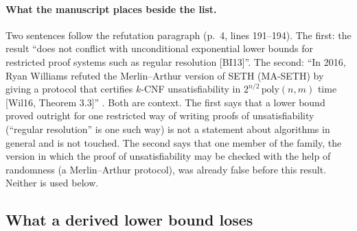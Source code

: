 \begin{table}[htbp]
\caption{The hypotheses the manuscript's \S1.1.1--\S1.1.2 list, each in
the form the manuscript states it (page of \texttt{paper.pdf}, lines of
the committed extract), with the manuscript's own source for that form,
the logical form in symbols, and the part of the verified theorem that
denies it (lines 194--217 of the comparator file at \texttt{4eaee875}).
$A$, $C_k$, $d_k$ are the never-computed constants of
Section~\ref{sec:statement}. Generated, with every page and fragment
checked against the extract and the clone, by
\texttt{python3 -I paper3/scripts/consequences.py}.}
\label{tab:hypotheses}
\scriptsize

\end{table}

\paragraph{What the manuscript places beside the list.}
Two sentences follow the refutation paragraph (p.~4, lines 191--194).
The first: the result ``does not conflict with unconditional exponential
lower bounds for restricted proof systems such as regular resolution
[BI13]''. The second: ``In 2016, Ryan Williams refuted the Merlin--Arthur version of SETH
(MA-SETH) by giving a protocol that certifies $k$-CNF unsatisfiability
in $2^{n/2}\,\mathrm{poly}(n,m)$ time [Wil16, Theorem 3.3]''
\citep{Williams2016}. Both are context. The first says that a lower bound proved outright for one restricted way of writing proofs of unsatisfiability (``regular resolution'' is one such way) is not a statement about algorithms in general and is not touched. The second says that one member of the family, the version in which the proof of unsatisfiability may be checked with the help of randomness (a Merlin--Arthur protocol), was already false before this result. Neither is used below.

\subsection{What a derived lower bound loses}
\label{sec:consequences-lower-bounds}

